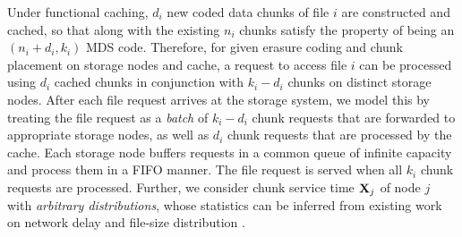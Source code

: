 Under functional caching, $d_i$ new coded data chunks of file $i$ are constructed and cached, so that along with the existing $n_i$ chunks satisfy the property of being an $(n_i+d_i,k_i)$ MDS code. Therefore, for given erasure coding and chunk placement on storage nodes and cache, a request to access file $i$ can be processed using $d_i$ cached chunks in conjunction with $k_i-d_i$ chunks on distinct storage nodes. After each file request arrives at the storage system, we model this by treating the file request as a {\em batch} of $k_i-d_i$ chunk requests that are forwarded to appropriate storage nodes, as well as $d_i$ chunk requests that are processed by the cache. Each storage node buffers requests in a common queue of infinite capacity and process them in a FIFO manner. The file request is served when all $k_i$ chunk requests are processed. Further, we consider chunk service time ${\bf X}_j$ of node $j$ with {\em arbitrary distributions}, whose statistics can be inferred from existing work on network delay \cite{AY11,WK} and file-size distribution \cite{D11,PT12}.







